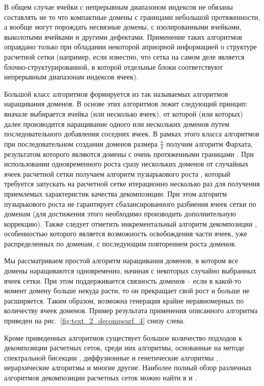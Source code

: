 В общем случае ячейки с непрерывным диапазоном индексов не обязаны составлять не то что компактные домены с границами небольшой протяженности, а вообще могут порождать несвязные домены, с изолированными ячейками, выколотыми ячейками и другими дефектами.
Применение таких алгоритмов оправдано только при обладании некоторой априорной информацией о структуре расчетной сетки (например, если известно, что сетка на самом деле является блочно-структурированной, в которой отдельные блоки соответствуют непрерывным диапазонам индексов ячеек).

Большой класс алгоритмов формируется из так называемых алгоритмов наращивания доменов.
В основе этих алгоритмов лежит следующий принцип: вначале выбирается ячейка (или несколько ячеек), от которой (или которых) далее производится наращивание одного или нескольких доменов путем последовательного добавления соседних ячеек.
В рамках этого класса алгоритмов при последовательном создании доменов размера $\frac{n}{k}$ получим алгоритм Фархата, результатом которого являются домены с очень протяженными границами \cite{Farhat1988Decomp}.
При использовании одновременного роста сразу нескольких доменов от случайных ячеек расчетной сетки получаем алгоритм пузырькового роста \cite{Preis1997Decomp}, который требуется запускать на расчетной сетке итерационно несколько раз для получения приемлемых характеристик качества декомпозиции.
При этом алгоритм пузырькового роста не гарантирует сбалансированного разбиения ячеек сетки по доменам (для достижения этого необходимо производить дополнительную коррекцию).
Также следует отметить инкрементальный алгоритм декомпозиции \cite{Yakobovsky2005Decomp}, особенностью которого является возможность освобождения части ячеек, уже распределенных по доменам, с последующим повторением роста доменов.

Мы рассматриваем простой алгоритм наращивания доменов, в котором все домены наращиваются одновременно, начиная с некоторых случайно выбранных ячеек сетки.
При этом поддерживается связность доменов -- если в какой-то момент домену больше некуда расти, то он прекращает свой рост и больше не расширяется.
Таким образом, возможна генерация крайне неравномерных по количеству ячеек доменов.
Пример результата применения описанного алгоритма приведен на рис.~\ref{fig:text_2_decompsurf_4} снизу слева.

Кроме приведенных алгоритмов существует большое количество подходов к декомпозиции расчетных сеток, среди них алгоритмы, основанные на методе спектральной бисекции \cite{Urschel2014Decomp}, диффузионные и генетические алгоритмы \cite{Zhao2019Decomp}, иерархические алгоритмы \cite{Kapyris1998Decomp} и многие другие.
Наиболее полный обзор различных алгоритмов декомпозиции расчетных сеток можно найти в \cite{Golovchenko2020Decomp} и \cite{Zheleznyakova2017Decomp}.

